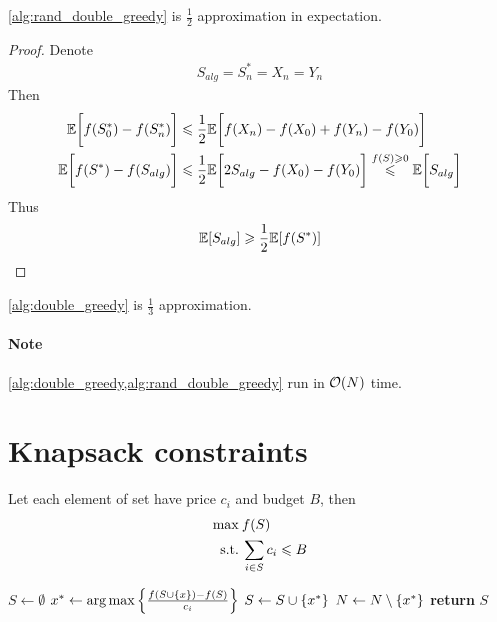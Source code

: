\begin{theorem}
	\vref{alg:rand_double_greedy} is $\frac{1}{2}$ approximation in expectation.
	\begin{proof}
		Denote 
		\begin{align}
			S_{alg} = S^*_n=X_n=Y_n
		\end{align}
		Then
		\begin{align}
		\mathbb{E} \qty\bigg[f(S^*_{0}) - f(S^*_n)] &\leqslant \frac{1}{2} \mathbb{E} \qty\bigg[f(X_n) - f(X_{0})+f(Y_n) - f(Y_{0}) ]\\
		\mathbb{E} \qty\bigg[f(S^*) - f(S_{alg})] &\leqslant \frac{1}{2} \mathbb{E} \qty\bigg[2S_{alg} - f(X_{0}) - f(Y_{0}) ]\stackrel{f(S)\geqslant 0}{\leqslant} \mathbb{E} \qty\bigg[S_{alg} ]
		\end{align}
		Thus
		\begin{align}
		\mathbb{E} \qty[S_{alg} ] \geqslant\frac{1}{2}\mathbb{E} \qty[f(S^*)] 
		\end{align}
		
	\end{proof}

\begin{coll}
	\vref{alg:double_greedy} is $\frac{1}{3}$ approximation.
\end{coll}
\end{theorem}


\paragraph{Note} \vref{alg:double_greedy,alg:rand_double_greedy} run in $\order{N}$ time.


\section{Knapsack constraints}
Let each element of set have price $c_i$ and budget $B$, then
\begin{align}
\max \: & f(S)\\
\text{s.t.} \: & \sum_{i \in S} c_i \leqslant B
\end{align}


\begin{algorithm}
	\caption{}\label{alg:knapsack_greedy}
	\begin{algorithmic}[1]
		\State $S \gets \emptyset$
		\State $x^* \gets \arg \max \qty{ \frac{f(S\cup \qty{x})-f(S)}{c_i}}$
		\State $S\gets S \cup \qty{x^*}$
		\EndIf
		\State $N \gets N\setminus \qty{x^*}$
		\EndWhile
		\State \textbf{return} $S$
		\EndProcedure
	\end{algorithmic}
\end{algorithm}

